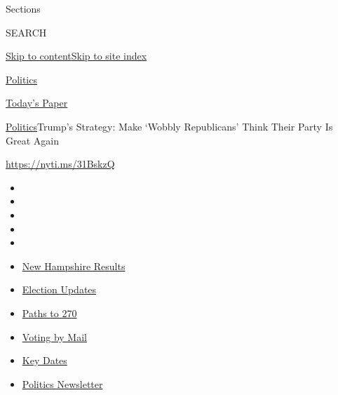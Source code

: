 Sections

SEARCH

\protect\hyperlink{site-content}{Skip to
content}\protect\hyperlink{site-index}{Skip to site index}

\href{https://www.nytimes3xbfgragh.onion/section/politics}{Politics}

\href{https://myaccount.nytimes3xbfgragh.onion/auth/login?response_type=cookie\&client_id=vi}{}

\href{https://www.nytimes3xbfgragh.onion/section/todayspaper}{Today's
Paper}

\href{/section/politics}{Politics}\textbar{}Trump's Strategy: Make
`Wobbly Republicans' Think Their Party Is Great Again

\url{https://nyti.ms/31BskzQ}

\begin{itemize}
\item
\item
\item
\item
\item
\end{itemize}

\begin{itemize}
\item
  \href{https://www.nytimes3xbfgragh.onion/interactive/2020/09/08/us/elections/results-new-hampshire-primary-elections.html?action=click\&pgtype=Article\&state=default\&region=TOP_BANNER\&context=storylines_menu}{New
  Hampshire Results}
\item
  \href{https://www.nytimes3xbfgragh.onion/live/2020/09/08/us/trump-vs-biden?action=click\&pgtype=Article\&state=default\&region=TOP_BANNER\&context=storylines_menu}{Election
  Updates}
\item
  \href{https://www.nytimes3xbfgragh.onion/interactive/2020/us/elections/election-states-biden-trump.html?action=click\&pgtype=Article\&state=default\&region=TOP_BANNER\&context=storylines_menu}{Paths
  to 270}
\item
  \href{https://www.nytimes3xbfgragh.onion/interactive/2020/08/31/us/politics/vote-by-mail-deadlines.html?action=click\&pgtype=Article\&state=default\&region=TOP_BANNER\&context=storylines_menu}{Voting
  by Mail}
\item
  \href{https://www.nytimes3xbfgragh.onion/interactive/2019/us/elections/2020-presidential-election-calendar.html?action=click\&pgtype=Article\&state=default\&region=TOP_BANNER\&context=storylines_menu}{Key
  Dates}
\item
  \href{https://www.nytimes3xbfgragh.onion/newsletters/politics?action=click\&pgtype=Article\&state=default\&region=TOP_BANNER\&context=storylines_menu}{Politics
  Newsletter}
\end{itemize}

